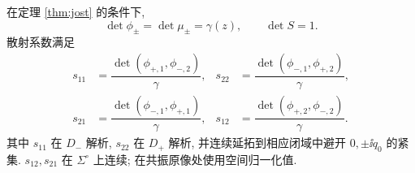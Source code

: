 \begin{proposition}\label{prop:scattering}
在定理 \ref{thm:jost} 的条件下,
\begin{equation}\label{eq:detjost}
\det\phi_\pm=\det\mu_\pm=\gamma(z),\qquad \det S=1.
\end{equation}
散射系数满足
\begin{align}
s_{11}&=\dfrac{\det(\phi_{+,1},\phi_{-,2})}{\gamma},&
s_{22}&=\dfrac{\det(\phi_{-,1},\phi_{+,2})}{\gamma},\label{eq:wronskian}\\
s_{21}&=\dfrac{\det(\phi_{-,1},\phi_{+,1})}{\gamma},&
s_{12}&=\dfrac{\det(\phi_{+,2},\phi_{-,2})}{\gamma}.\nonumber
\end{align}
其中 $s_{11}$ 在 $D_-$ 解析, $s_{22}$ 在 $D_+$ 解析, 并连续延拓到相应闭域中避开 $0,\pm\ii q_0$ 的紧集. $s_{12},s_{21}$ 在 $\Sigma^\circ$ 上连续; 在共振原像处使用空间归一化值.
\end{proposition}
